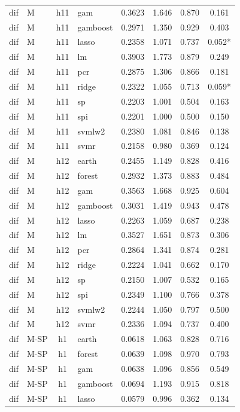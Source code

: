 \begin{ThreePartTable}
\begin{longtable}[t]{llclcccc}
dif & M & h11 & gam & 0.3623 & 1.646 & 0.870 & 0.161\\
dif & M & h11 & gamboost & 0.2971 & 1.350 & 0.929 & 0.403\\
dif & M & h11 & lasso & 0.2358 & 1.071 & 0.737 & 0.052*\\
dif & M & h11 & lm & 0.3903 & 1.773 & 0.879 & 0.249\\
dif & M & h11 & pcr & 0.2875 & 1.306 & 0.866 & 0.181\\
dif & M & h11 & ridge & 0.2322 & 1.055 & 0.713 & 0.059*\\
dif & M & h11 & sp & 0.2203 & 1.001 & 0.504 & 0.163\\
dif & M & h11 & spi & 0.2201 & 1.000 & 0.500 & 0.150\\
dif & M & h11 & svmlw2 & 0.2380 & 1.081 & 0.846 & 0.138\\
dif & M & h11 & svmr & 0.2158 & 0.980 & 0.369 & 0.124\\
\addlinespace
dif & M & h12 & earth & 0.2455 & 1.149 & 0.828 & 0.416\\
dif & M & h12 & forest & 0.2932 & 1.373 & 0.883 & 0.484\\
dif & M & h12 & gam & 0.3563 & 1.668 & 0.925 & 0.604\\
dif & M & h12 & gamboost & 0.3031 & 1.419 & 0.943 & 0.478\\
dif & M & h12 & lasso & 0.2263 & 1.059 & 0.687 & 0.238\\
dif & M & h12 & lm & 0.3527 & 1.651 & 0.873 & 0.306\\
dif & M & h12 & pcr & 0.2864 & 1.341 & 0.874 & 0.281\\
dif & M & h12 & ridge & 0.2224 & 1.041 & 0.662 & 0.170\\
dif & M & h12 & sp & 0.2150 & 1.007 & 0.532 & 0.165\\
dif & M & h12 & spi & 0.2349 & 1.100 & 0.766 & 0.378\\
dif & M & h12 & svmlw2 & 0.2244 & 1.050 & 0.797 & 0.500\\
dif & M & h12 & svmr & 0.2336 & 1.094 & 0.737 & 0.400\\
\addlinespace
dif & M-SP & h1 & earth & 0.0618 & 1.063 & 0.828 & 0.716\\
dif & M-SP & h1 & forest & 0.0639 & 1.098 & 0.970 & 0.793\\
dif & M-SP & h1 & gam & 0.0638 & 1.096 & 0.856 & 0.549\\
dif & M-SP & h1 & gamboost & 0.0694 & 1.193 & 0.915 & 0.818\\
dif & M-SP & h1 & lasso & 0.0579 & 0.996 & 0.362 & 0.134\\

\end{longtable}
\end{ThreePartTable}
